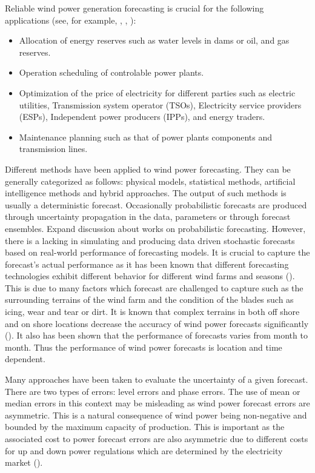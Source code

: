 \documentclass[11pt]{article}
\theoremstyle{definition}
\begin{document}
Reliable wind power generation forecasting is crucial for the following applications (see, for example, \cite[5]{gieb}, \cite[162]{chang}, \cite{zhbo}):
\begin{itemize}
\item Allocation of energy reserves such as water levels in dams or oil, and gas reserves.
\item Operation scheduling of controlable power plants.
\item Optimization of the price of electricity for different parties such as electric utilities, Transmission system operator (TSOs), Electricity service providers (ESPs), Independent power producers (IPPs), and energy traders.
\item Maintenance planning such as that of power plants components and transmission lines.

\end{itemize}

Different methods have been applied to wind power forecasting. They can be generally categorized as follows: physical models, statistical methods, artificial intelligence methods and hybrid approaches. The output of such methods is usually a deterministic forecast. Occasionally probabilistic forecasts are produced through uncertainty propagation in the data, parameters or through forecast ensembles. {\color{red} Expand discussion about works on probabilistic forecasting.} However, there is a lacking in simulating and producing data driven stochastic forecasts based on real-world performance of forecasting models. It is crucial to capture the forecast's actual performance as it has been known that different forecasting technologies exhibit different behavior for different wind farms and seasons (\cite{chang}). This is due to many factors which forecast are challenged to capture such as the surrounding terrains of the wind farm and the condition of the blades such as icing, wear and tear or dirt. It is known that complex terrains in both off shore and on shore locations decrease the accuracy of wind power forecasts significantly (\cite{schicker2017short}). It also has been shown that the performance of forecasts varies from month to month. Thus the performance of wind power forecasts is location and time dependent.

Many approaches have been taken to evaluate the uncertainty of a given forecast. There are two types of errors: level errors and phase errors. The use of mean or median errors in this context may be misleading as wind power forecast errors are asymmetric. This is a natural consequence of wind power being non-negative and bounded by the maximum capacity of production. This is important as the associated cost to power forecast errors are also asymmetric due to different costs for up and down power regulations which are determined by the electricity market (\cite{tsitsiklis2015pricing}).
\end{document}
